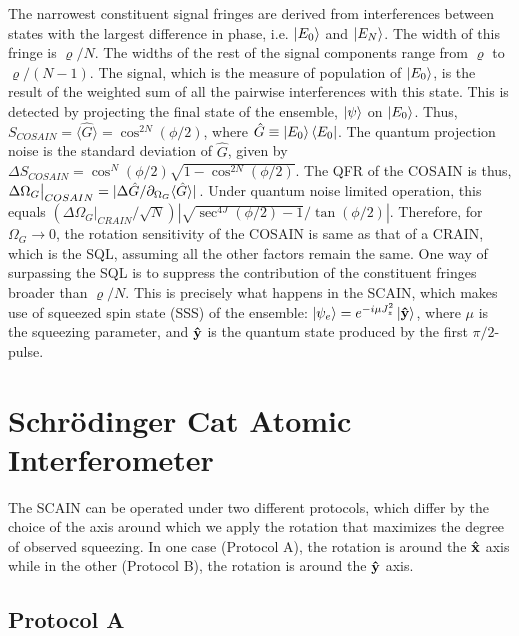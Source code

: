 \documentclass[aps,pra,letterpaper,superscriptaddress,showpacs,amsmath,floats,twocolumn]{revtex4-1}
\begin{document}
The narrowest constituent signal fringes are derived from interferences between states with the largest difference in phase, i.e. $\ket{E_0}$ and $\ket{E_N}$. The width of this fringe is $\varrho/N$. The widths of the rest of the signal components range from $\varrho$ to $\varrho/(N-1)$. The signal, which is the measure of population of $\ket{E_0}$, is the result of the weighted sum of all the pairwise interferences with this state. This is detected by projecting the final state of the ensemble, $\ket{\psi}$ on $\ket{E_0}$. Thus, $S_{COSAIN} = \langle\hat{G}\rangle=\cos^{2N}(\phi/2)$, where $\hat{G} \equiv\ket{E_0}\bra{E_0}$. The quantum projection noise is the standard deviation of $\hat{G}$, given by $\Delta S_{COSAIN} = \cos^{N}(\phi/2)\sqrt{1-\cos^{2N}(\phi/2)}$. The QFR of the COSAIN is thus, $\Delta \Omega_G\bigr|_{COSAIN} = \abs*{\Delta \hat{G}/\partial_{\Omega_G} \langle \hat{G}\rangle}$. Under quantum noise limited operation, this equals $(\Delta \Omega_G\bigr|_{CRAIN}/\sqrt{N})|\sqrt{\sec^{4J}(\phi/2)-1}/\tan(\phi/2)|$. Therefore, for $\Omega_G \rightarrow 0$, the rotation sensitivity of the COSAIN is same as that of a CRAIN, which is the SQL, assuming all the other factors remain the same. One way of surpassing the SQL is to suppress the contribution of the constituent fringes broader than $\varrho/N$. This is precisely what happens in the SCAIN, which makes use of squeezed spin state (SSS) of the ensemble: $\ket{\psi_e}=e^{-i\mu J_z^2}\ket{\vu{y}}$, where $\mu$ is the squeezing parameter, and $\vu{y}$ is the quantum state produced by the first $\pi/2$-pulse.



\section{Schr\"odinger Cat Atomic Interferometer}
\label{SCAIN}
The SCAIN can be operated under two different protocols, which differ by the choice of the axis around which we apply the rotation that maximizes the degree of observed squeezing. In one case (Protocol A), the rotation is around the $\vu{x}$ axis while in the other (Protocol B), the rotation is around the $\vu{y}$ axis.

\subsection{Protocol A}
\end{document}
